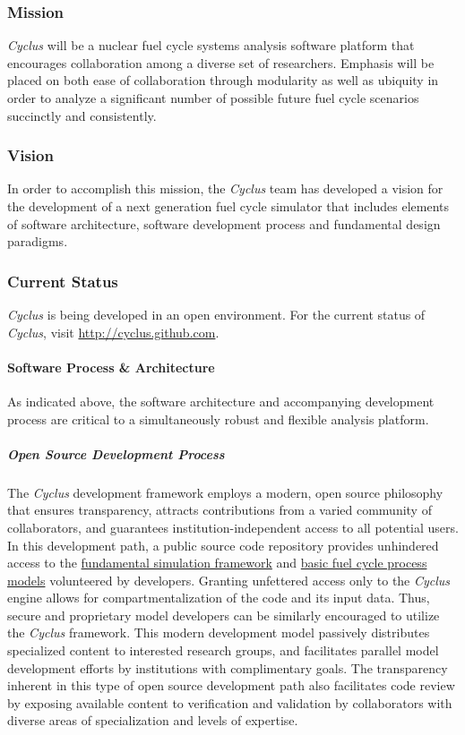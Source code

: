 \documentclass[letterpaper,10pt,english]{sphinxmanual}
\begin{document}
\subsubsection{Mission}
\label{basics/introduction:mission}
\emph{Cyclus}  will be a nuclear fuel cycle systems analysis software platform that
encourages collaboration among a diverse set of researchers. Emphasis will be
placed on both ease of collaboration through modularity as well as ubiquity in
order to analyze a significant number of possible future fuel cycle scenarios
succinctly and consistently.


\subsubsection{Vision}
\label{basics/introduction:vision}
In order to accomplish this mission, the \emph{Cyclus} team has developed a vision
for the development of a next generation fuel cycle simulator that includes
elements of software architecture, software development process and
fundamental design paradigms.


\subsubsection{Current Status}
\label{basics/introduction:current-status}
\emph{Cyclus} is being developed in an open environment.  For the current status of \emph{Cyclus}, visit \href{http://cyclus.github.com}{http://cyclus.github.com}.


\paragraph{Software Process \& Architecture}
\label{basics/introduction:software-process-architecture}
As indicated above, the software architecture and accompanying development
process are critical to a simultaneously robust and flexible analysis platform.


\subparagraph{Open Source Development Process}
\label{basics/introduction:open-source-development-process}
The \emph{Cyclus} development framework employs a modern, open source philosophy
that ensures transparency, attracts contributions from a varied community of
collaborators, and guarantees institution-independent access to all potential
users. In this development path, a public source code repository provides
unhindered access to the \href{http://github.com/cyclus/cyclys}{fundamental simulation framework} and
\href{http://github.com/cyclus/cycamore}{basic fuel cycle process models} volunteered by developers.
Granting unfettered access only to
the \emph{Cyclus} engine allows for compartmentalization of the code and its input
data. Thus, secure and proprietary model developers can be similarly encouraged
to utilize the \emph{Cyclus} framework. This modern development model passively
distributes specialized content to interested research groups, and facilitates
parallel model development efforts by institutions with complimentary goals.
The transparency inherent in this type of open source development path also
facilitates code review by exposing available content to verification and
validation by collaborators with diverse areas of specialization and levels of
expertise.
\end{document}

